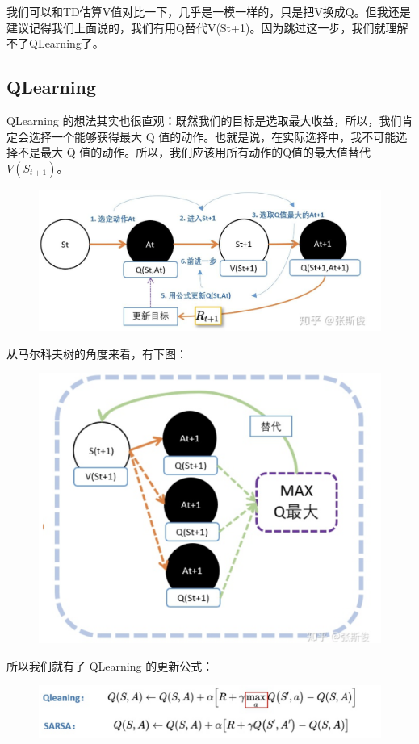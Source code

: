 \documentclass[12pt]{article}
\begin{document}
我们可以和TD估算V值对比一下，几乎是一模一样的，只是把V换成Q。但我还是建议记得我们上面说的，我们有用Q替代V(St+1)。因为跳过这一步，我们就理解不了QLearning了。

\subsection{QLearning}
QLearning 的想法其实也很直观：既然我们的目标是选取最大收益，所以，我们肯定会选择一个能够获得最大 Q 值的动作。也就是说，在实际选择中，我不可能选择不是最大 Q 值的动作。所以，我们应该用所有动作的Q值的最大值替代 $V(S_{t+1}) $。
\begin{figure}[H]
    \centering
    \includegraphics[width=.8\textwidth]{fig/ReinforcementLearning/RL_QLearning_Update_V.png}
\end{figure}

从马尔科夫树的角度来看，有下图：
\begin{figure}[H]
    \centering
    \includegraphics[width=.6\textwidth]{fig/ReinforcementLearning/RL_QLearning_Select_Max.png}
\end{figure}

所以我们就有了 QLearning 的更新公式：
\begin{figure}[H]
    \centering
    \includegraphics[width=.8\textwidth]{fig/ReinforcementLearning/RL_QLearning_Update_V_Eq.png}
\end{figure}
\end{document}
